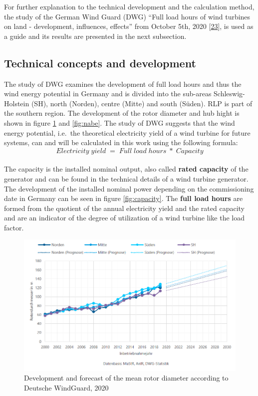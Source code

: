 \documentclass[a4paper,11pt]{article}
\begin{document}
For further explanation to the technical development and the calculation method, the study of the German Wind Guard (DWG) ``Full load hours of wind turbines on land - development, influences, effects'' from October 5th, 2020 {[}\protect\hyperlink{ref-RasmusBorrmannDr.KnudRehfeldtDr.DennisKruse.2020}{23}{]}, is used as a guide and its results are presented in the next subsection.

\hypertarget{technical-concepts-and-development}{%
\subsection{Technical concepts and development}\label{technical-concepts-and-development}}

The study of DWG examines the development of full load hours and thus the wind energy potential in Germany and is divided into the sub-areas Schleswig-Holstein (SH), north (Norden), centre (Mitte) and south (Süden). RLP is part of the southern region. The development of the rotor diameter and hub hight is shown in figure \ref{fig:rotor} and \ref{fig:nabe}. The study of DWG suggests that the wind energy potential, i.e.~the theoretical electricity yield of a wind turbine for future systems, can and will be calculated in this work using the following formula:
\[
Electricity\;yield\; =\; Full\;load\;hours\; *\; Capacity
\]\\
The capacity is the installed nominal output, also called \textbf{rated capacity} of the generator and can be found in the technical details of a wind turbine generator. The development of the installed nominal power depending on the commissioning date in Germany can be seen in figure \ref{fig:capacity}. The \textbf{full load hours} are formed from the quotient of the annual electricity yield and the rated capacity and are an indicator of the degree of utilization of a wind turbine like the load factor.
\begin{figure}

{\centering \includegraphics[width=1\linewidth]{figures/DWG/DWG_Rotordurchmesser} 

}

\caption{Development and forecast of the mean rotor diameter according to Deutsche WindGuard, 2020}\label{fig:rotor}
\end{figure}
\end{document}
